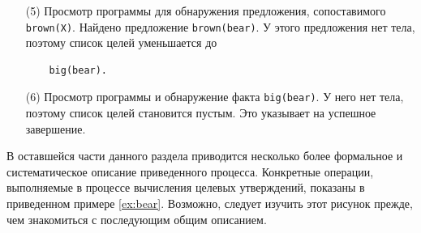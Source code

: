\documentclass[12pt, openany, twoside]{book} %
\begin{document}
\begin{itemize}
\item[(5)] Просмотр программы для обнаружения предложения, сопоставимого \texttt{brown(X)}. Найдено предложение \texttt{brown(bear)}. У этого предложения нет тела, поэтому список целей уменьшается до
{\tt\begin{verbatim}
    big(bear).
\end{verbatim}}

\item[(6)] Просмотр программы и обнаружение факта \texttt{big(bear)}. У него нет тела, поэтому список целей становится пустым. Это указывает на успешное завершение.
\end{itemize}

В оставшейся части данного раздела приводится несколько более формальное и систематическое описание приведенного процесса. Конкретные операции, выполняемые в процессе вычисления целевых утверждений, показаны в приведенном примере \ref{ex:bear}. Возможно, следует изучить этот рисунок прежде, чем знакомиться с последующим общим описанием.
\end{document}
